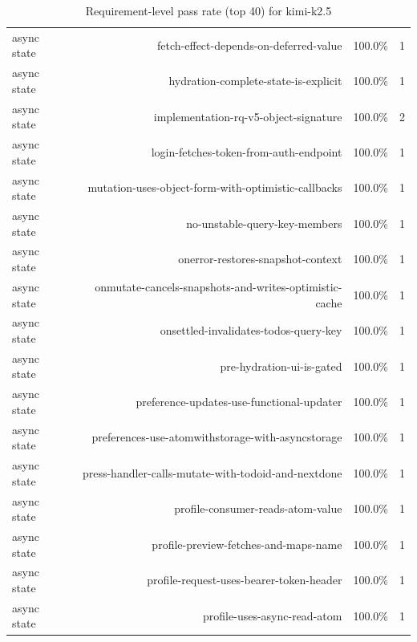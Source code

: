 \begin{table}[htbp]
\begin{tabular}{lrrr}
async state & fetch-effect-depends-on-deferred-value & 100.0\% & 1 \\
async state & hydration-complete-state-is-explicit & 100.0\% & 1 \\
async state & implementation-rq-v5-object-signature & 100.0\% & 2 \\
async state & login-fetches-token-from-auth-endpoint & 100.0\% & 1 \\
async state & mutation-uses-object-form-with-optimistic-callbacks & 100.0\% & 1 \\
async state & no-unstable-query-key-members & 100.0\% & 1 \\
async state & onerror-restores-snapshot-context & 100.0\% & 1 \\
async state & onmutate-cancels-snapshots-and-writes-optimistic-cache & 100.0\% & 1 \\
async state & onsettled-invalidates-todos-query-key & 100.0\% & 1 \\
async state & pre-hydration-ui-is-gated & 100.0\% & 1 \\
async state & preference-updates-use-functional-updater & 100.0\% & 1 \\
async state & preferences-use-atomwithstorage-with-asyncstorage & 100.0\% & 1 \\
async state & press-handler-calls-mutate-with-todoid-and-nextdone & 100.0\% & 1 \\
async state & profile-consumer-reads-atom-value & 100.0\% & 1 \\
async state & profile-preview-fetches-and-maps-name & 100.0\% & 1 \\
async state & profile-request-uses-bearer-token-header & 100.0\% & 1 \\
async state & profile-uses-async-read-atom & 100.0\% & 1 \\
\bottomrule
\end{tabular}
\caption{Requirement-level pass rate (top 40) for kimi-k2.5}
\end{table}
